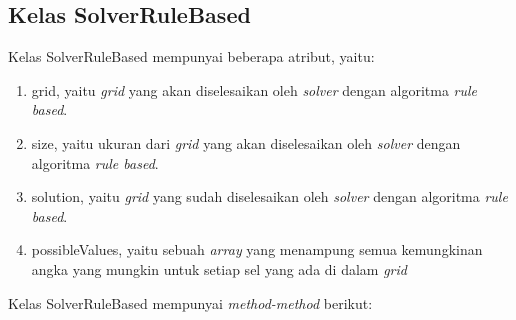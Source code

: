 \subsection{Kelas SolverRuleBased}
\label{sec:kelassolverrb}

Kelas SolverRuleBased mempunyai beberapa atribut, yaitu:

\begin{enumerate}
\item grid, yaitu \textit{grid} yang akan diselesaikan oleh \textit{solver} dengan algoritma \textit{rule based}.
\item size, yaitu ukuran dari \textit{grid} yang akan diselesaikan oleh \textit{solver} dengan algoritma \textit{rule based}.
\item solution, yaitu \textit{grid} yang sudah diselesaikan oleh \textit{solver} dengan algoritma \textit{rule based}.
\item possibleValues, yaitu sebuah \textit{array} yang menampung semua kemungkinan angka yang mungkin untuk setiap sel yang ada di dalam \textit{grid}
\end{enumerate}

Kelas SolverRuleBased mempunyai \textit{method-method} berikut:

